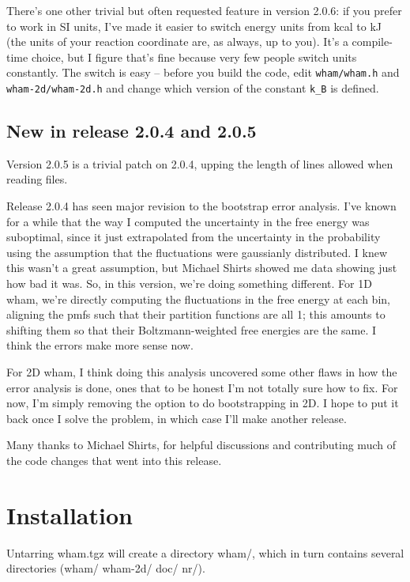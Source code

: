 \documentclass[12pt]{article}
\begin{document}
There's one other trivial but often requested feature in version 2.0.6: if
you prefer to work in SI units, I've made it easier to switch energy units
from kcal to kJ (the units of your reaction coordinate are, as always, up to
you).  It's a compile-time choice, but I figure that's fine because very few
people switch units constantly.  The switch is easy -- before you build the
code, edit {\tt wham/wham.h} and {\tt wham-2d/wham-2d.h} and change which
version of the constant {\tt k\_B} is defined.

\subsection{New in release 2.0.4 and 2.0.5}

Version 2.0.5 is a trivial patch on 2.0.4, upping the length of lines allowed
when reading files.

Release 2.0.4 has seen major revision to the bootstrap error analysis.  I've
known for a while that the way I computed the uncertainty in the free energy was
suboptimal, since it just extrapolated from the uncertainty in the probability
using the assumption that the fluctuations were gaussianly distributed.  I knew
this wasn't a great assumption, but Michael Shirts showed me data showing just
how bad it was.  So, in this version, we're doing something different.  For 1D
wham, we're directly computing the fluctuations in the free energy at each bin,
aligning the pmfs such that their partition functions are all 1; this amounts to
shifting them so that their Boltzmann-weighted free energies are the same.  I
think the errors make more sense now.

For 2D wham, I think doing this analysis uncovered some other flaws in how the
error analysis is done, ones that to be honest I'm not totally sure how to
fix.  For now, I'm simply removing the option to do bootstrapping in 2D.  I
hope to put it back once I solve the problem, in which case I'll make another
release.

Many thanks to Michael Shirts, for helpful discussions and contributing much
of the code changes that went into this release.

\section{Installation}

Untarring wham.tgz will create a directory wham/, which in turn contains
several directories (wham/ wham-2d/ doc/ nr/).
\end{document}
